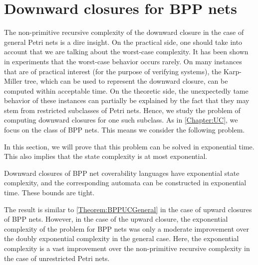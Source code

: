 \documentclass[../../diss.tex]{subfiles}
\begin{document}
\section{Downward closures for BPP nets}%
\label{Section:BPPDC}%

The non-primitive recursive complexity of the downward closure in the case of general Petri nets is a dire insight.
On the practical side, one should take into account that we are talking about the worst-case complexity.
It has been shown in experiments that the worst-case behavior occurs rarely.
On many instances that are of practical interest (\eg for the purpose of verifying systems), the Karp-Miller tree, which can be used to represent the downward closure, can be computed within acceptable time.
On the theoretic side, the unexpectedly tame behavior of these instances can partially be explained by the fact that they may stem from restricted subclasses of Petri nets.
Hence, we study the problem of computing downward closures for one such subclass.
As in \cref{Chapter:UC}, we focus on the class of BPP nets.
This means we consider the following problem.

\begin{compproblem}
    \problemshort{($\BPPDC$)}
\end{compproblem}

In this section, we will prove that this problem can be solved in exponential time.
This also implies that the state complexity is at most exponential.

\begin{theorem}%
\label{Theorem:BPPDCGeneral}%
    Downward closures of BPP net coverability languages have exponential state complexity, and the corresponding automata can be constructed in exponential time. These bounds are tight.
\end{theorem}

The result is similar to \cref{Theorem:BPPUCGeneral} in the case of upward closures of BPP nets.
However, in the case of the upward closure, the exponential complexity of the problem for BPP nets was only a moderate improvement over the doubly exponential complexity in the general case.
Here, the exponential complexity is a vast improvement over the non-primitive recursive complexity in the case of unrestricted Petri nets.
\end{document}
